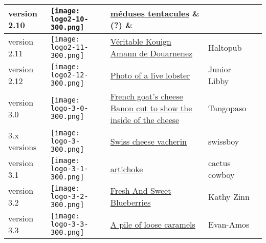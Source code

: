 \begin{longtable}{| l | l | p{3.5cm} | p{3cm} | l |}
	\\\hline
	version 2.10 & \texttt{[image: logo2-10-300.png]} & \href{https://pixabay.com/fr/m%C3%A9duse-tentacules-medusa-marine-154799/}{méduses tentacules} & (?) & \cczero{}
	\\\hline
	version 2.11 & \texttt{[image: logo2-11-300.png]} & \href{https://commons.wikimedia.org/wiki/File:Kouignamann.JPG}{Véritable Kouign Amann de Douarnenez} & Haltopub & \publicdomain{}
	\\\hline
	version 2.12 & \texttt{[image: logo2-12-300.png]} & \href{https://publicdomainpictures.net/en/view-image.php?image=39798&picture=lobster}{Photo of a live lobster} & Junior Libby & \cczero{}
	\\\hline
	version 3.0 & \texttt{[image: logo-3-0-300.png]} & \href{https://commons.wikimedia.org/wiki/File:Banon2.jpg}{French goat's cheese Banon cut to show the inside of the cheese} & Tangopaso & \publicdomain{}
	\\\hline
	3.x versions & \texttt{[image: logo-3-300.png]} & \href{https://openclipart.org/detail/308414/swiss-cheese-vacherin-swiss-food}{Swiss cheese vacherin} & swissboy & \publicdomain{}
	\\\hline
	version 3.1 & \texttt{[image: logo-3-1-300.png]} & \href{https://openclipart.org/detail/291385/artichoke}{artichoke} & cactus cowboy & \publicdomain{}
	\\\hline
	version 3.2 & \texttt{[image: logo-3-2-300.png]} & \href{https://www.publicdomainpictures.net/en/view-image.php?image=117097&picture=fresh-and-sweet-blueberries}{Fresh And Sweet Blueberries} & Kathy Zinn & \cczero{}
	\\\hline
	version 3.3 & \texttt{[image: logo-3-3-300.png]} & \href{https://commons.wikimedia.org/wiki/File:Caramels.jpg}{A pile of loose caramels} & Evan-Amos & \ccbysathree{}
	\\\hline
\end{longtable}


